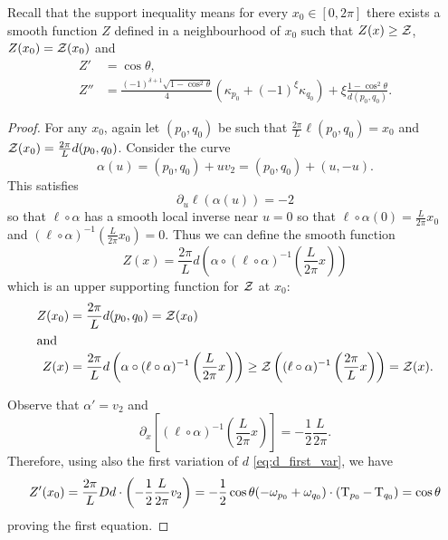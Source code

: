 \documentclass[a4paper, 12pt]{amsart}
\begin{document}
Recall that the support inequality means for every $x_0 \in [0,2\pi]$ there exists a smooth function $Z$ defined in a neighbourhood of $x_0$ such that $Z(x) \geq \operatorname{\mathcal{Z}}$, $Z(x_0) = \operatorname{\mathcal{Z}}(x_0)$ and
\begin{align*}
Z' &= \cos \theta, \\
Z'' &= \frac{(-1)^{\delta+1}\sqrt{1-\cos^2\theta}}{4} (\kappa_{p_0} + (-1)^{\xi}\kappa_{q_0}) + \xi \frac{1-\cos^2\theta}{d(p_0,q_0)}.
\end{align*}

\begin{proof}
For any $x_0$, again let $(p_0,q_0)$ be such that $\frac{2\pi}{L}\ell(p_0,q_0) = x_0$ and $\operatorname{\mathcal{Z}}(x_0) = \frac{2\pi}{L} d(p_0,q_0)$. Consider the curve
\[
\alpha(u) = (p_0, q_0) + uv_2 = (p_0, q_0) + (u,-u).
\]
This satisfies
\[
\partial_u \ell(\alpha(u)) = -2
\]
so that $\ell\circ\alpha$ has a smooth local inverse near $u=0$ so that \(\ell \circ \alpha(0) = \frac{L}{2\pi} x_0\) and \((\ell \circ \alpha)^{-1} \left(\frac{L}{2\pi} x_0\right) = 0\). Thus we can define the smooth function
\[
Z(x) = \frac{2\pi}{L} d\left(\alpha \circ (\ell\circ\alpha)^{-1} \left(\frac{L}{2\pi}x\right)\right)
\]
which is an upper supporting function for \(\operatorname{\mathcal{Z}}\) at \(x_0\):
\begin{align*}
Z(x_0) &= \frac{2\pi}{L} d(p_0, q_0) = \operatorname{\mathcal{Z}}(x_0) \\
\intertext{and}
Z(x) &= \frac{2\pi}{L} d\left(\alpha \circ (\ell\circ\alpha)^{-1} \left(\frac{L}{2\pi}x\right)\right) \geq \operatorname{\mathcal{Z}} \left((\ell\circ\alpha)^{-1} \left(\frac{2\pi}{L}x\right)\right) = \operatorname{\mathcal{Z}}(x).
\end{align*}

Observe that $\alpha' = v_2$ and
\[
\partial_x \left[(\ell\circ\alpha)^{-1} \left(\frac{L}{2\pi}x\right)\right] = -\frac{1}{2} \frac{L}{2\pi}.
\]
Therefore, using also the first variation of $d$ \eqref{eq:d_first_var}, we have
\[
Z'(x_0) = \frac{2\pi}{L} D d \cdot \left(-\frac{1}{2}\frac{L}{2\pi} v_2\right) = -\frac{1}{2} \cos\theta (-\omega_{p_0} + \omega_{q_0}) \cdot (\operatorname{T}_{p_0} - \operatorname{T}_{q_0}) = \cos\theta
\]
proving the first equation.


\end{proof}
\end{document}
